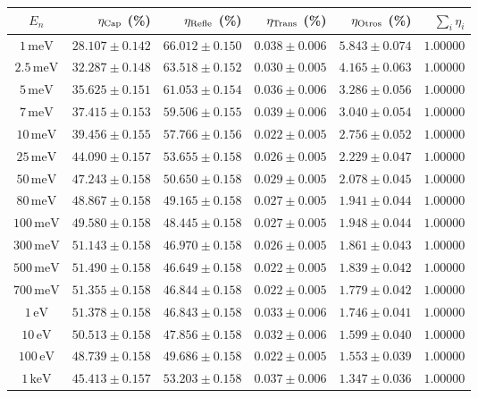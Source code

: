 \begin{tabular}{crrrrr}
\toprule
$E_n$ & $\eta_{\rm Cap}$ (\%) & $\eta_{\rm Refle}$ (\%) & $\eta_{\rm Trans}$ (\%) & $\eta_{\rm Otros}$ (\%) & $\sum_i \eta_i$ \\
\midrule
$1\,\mathrm{meV}$ & $28.107\pm0.142$ & $66.012\pm0.150$ & $0.038\pm0.006$ & $5.843\pm0.074$ & $1.00000$ \\
$2.5\,\mathrm{meV}$ & $32.287\pm0.148$ & $63.518\pm0.152$ & $0.030\pm0.005$ & $4.165\pm0.063$ & $1.00000$ \\
$5\,\mathrm{meV}$ & $35.625\pm0.151$ & $61.053\pm0.154$ & $0.036\pm0.006$ & $3.286\pm0.056$ & $1.00000$ \\
$7\,\mathrm{meV}$ & $37.415\pm0.153$ & $59.506\pm0.155$ & $0.039\pm0.006$ & $3.040\pm0.054$ & $1.00000$ \\
$10\,\mathrm{meV}$ & $39.456\pm0.155$ & $57.766\pm0.156$ & $0.022\pm0.005$ & $2.756\pm0.052$ & $1.00000$ \\
$25\,\mathrm{meV}$ & $44.090\pm0.157$ & $53.655\pm0.158$ & $0.026\pm0.005$ & $2.229\pm0.047$ & $1.00000$ \\
$50\,\mathrm{meV}$ & $47.243\pm0.158$ & $50.650\pm0.158$ & $0.029\pm0.005$ & $2.078\pm0.045$ & $1.00000$ \\
$80\,\mathrm{meV}$ & $48.867\pm0.158$ & $49.165\pm0.158$ & $0.027\pm0.005$ & $1.941\pm0.044$ & $1.00000$ \\
$100\,\mathrm{meV}$ & $49.580\pm0.158$ & $48.445\pm0.158$ & $0.027\pm0.005$ & $1.948\pm0.044$ & $1.00000$ \\
$300\,\mathrm{meV}$ & $51.143\pm0.158$ & $46.970\pm0.158$ & $0.026\pm0.005$ & $1.861\pm0.043$ & $1.00000$ \\
$500\,\mathrm{meV}$ & $51.490\pm0.158$ & $46.649\pm0.158$ & $0.022\pm0.005$ & $1.839\pm0.042$ & $1.00000$ \\
$700\,\mathrm{meV}$ & $51.355\pm0.158$ & $46.844\pm0.158$ & $0.022\pm0.005$ & $1.779\pm0.042$ & $1.00000$ \\
$1\,\mathrm{eV}$ & $51.378\pm0.158$ & $46.843\pm0.158$ & $0.033\pm0.006$ & $1.746\pm0.041$ & $1.00000$ \\
$10\,\mathrm{eV}$ & $50.513\pm0.158$ & $47.856\pm0.158$ & $0.032\pm0.006$ & $1.599\pm0.040$ & $1.00000$ \\
$100\,\mathrm{eV}$ & $48.739\pm0.158$ & $49.686\pm0.158$ & $0.022\pm0.005$ & $1.553\pm0.039$ & $1.00000$ \\
$1\,\mathrm{keV}$ & $45.413\pm0.157$ & $53.203\pm0.158$ & $0.037\pm0.006$ & $1.347\pm0.036$ & $1.00000$ \\

\end{tabular}
